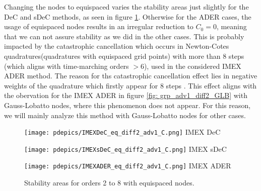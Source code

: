 Changing the nodes to equispaced varies the stability areas just slightly for the DeC and sDeC methods, as seen in figure \ref{fig: grp_adv1_diff2_eq}. 
Otherwise for the ADER cases, the usage of equispaced nodes results in an irregular reduction to $C_0=0$, meaning that we can not assure stability as we did in the other cases. This is probably impacted by the catastrophic cancellation which occurs in Newton-Cotes quadratures(quadratures with equispaced grid points) with more than 8 steps (which aligns with time-marching orders $>6$), used in the considered IMEX ADER method. The reason for ths catastrophic cancellation effect lies in negative weights of the quadrature which firstly appear for 8 steps \cite{Hanke}. This effect aligns with the obervation for the IMEX ADER in figure \ref{fig: grp_adv1_diff2_GLB} with Gauss-Lobatto nodes, where this phenomenon does not appear. For this reason, we will mainly analyze this method with Gauss-Lobatto nodes for other cases.

\begin{figure}[!h]
	\centering
	\begin{minipage}[t]{0.32\textwidth}
		\texttt{[image: pdepics/IMEXDeC\_eq\_diff2\_adv1\_C.png]}
		\centering
		IMEX DeC
	\end{minipage} 
	\begin{minipage}[t]{0.32\textwidth}
		\texttt{[image: pdepics/IMEXsDeC\_eq\_diff2\_adv1\_C.png]}
		\centering
		IMEX sDeC
	\end{minipage}
	\begin{minipage}[t]{0.32\textwidth}
		\texttt{[image: pdepics/IMEXADER\_eq\_diff2\_adv1\_C.png]}
		\centering
		IMEX ADER
	\end{minipage} 
	\caption{Stability areas for orders 2 to 8 with equispaced nodes.}
	\label{fig: grp_adv1_diff2_eq}
\end{figure}


